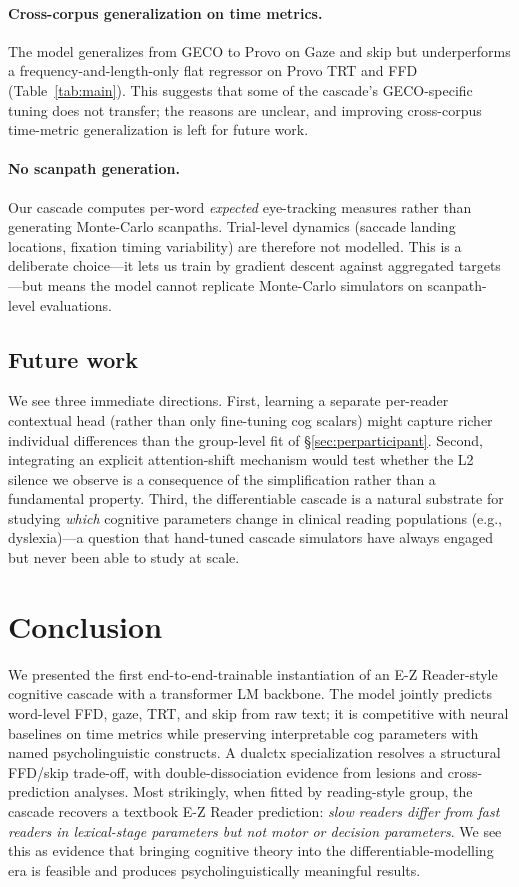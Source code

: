 \documentclass[11pt]{article}
\begin{document}
\paragraph{Cross-corpus generalization on time metrics.} The model generalizes from GECO to Provo on Gaze and skip but underperforms a frequency-and-length-only flat regressor on Provo TRT and FFD (Table~\ref{tab:main}). This suggests that some of the cascade's GECO-specific tuning does not transfer; the reasons are unclear, and improving cross-corpus time-metric generalization is left for future work.

\paragraph{No scanpath generation.} Our cascade computes per-word \emph{expected} eye-tracking measures rather than generating Monte-Carlo scanpaths. Trial-level dynamics (saccade landing locations, fixation timing variability) are therefore not modelled. This is a deliberate choice---it lets us train by gradient descent against aggregated targets---but means the model cannot replicate Monte-Carlo simulators on scanpath-level evaluations.

\subsection{Future work}\label{sec:future}

We see three immediate directions. First, learning a separate per-reader contextual head (rather than only fine-tuning cog scalars) might capture richer individual differences than the group-level fit of \S\ref{sec:perparticipant}. Second, integrating an explicit attention-shift mechanism would test whether the L2 silence we observe is a consequence of the simplification rather than a fundamental property. Third, the differentiable cascade is a natural substrate for studying \emph{which} cognitive parameters change in clinical reading populations (e.g., dyslexia)---a question that hand-tuned cascade simulators have always engaged but never been able to study at scale.

\section{Conclusion}\label{sec:conclusion}

We presented the first end-to-end-trainable instantiation of an E-Z Reader-style cognitive cascade with a transformer LM backbone. The model jointly predicts word-level FFD, gaze, TRT, and skip from raw text; it is competitive with neural baselines on time metrics while preserving interpretable cog parameters with named psycholinguistic constructs. A dualctx specialization resolves a structural FFD/skip trade-off, with double-dissociation evidence from lesions and cross-prediction analyses. Most strikingly, when fitted by reading-style group, the cascade recovers a textbook E-Z Reader prediction: \emph{slow readers differ from fast readers in lexical-stage parameters but not motor or decision parameters}. We see this as evidence that bringing cognitive theory into the differentiable-modelling era is feasible and produces psycholinguistically meaningful results.
\end{document}
